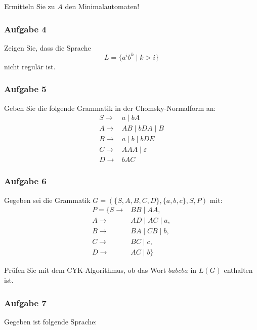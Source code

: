\documentclass[a4paper,14pt,ngerman]{scrartcl}
\begin{document}
Ermitteln Sie zu \(A\) den Minimalautomaten!
\subsubsection{\textbf{Aufgabe 4}}
\label{sec:org0993205}

Zeigen Sie, dass die Sprache \[L=\{a^ib^k \mid k > i\}\] nicht regulär
ist.
\subsubsection{\textbf{Aufgabe 5}}
\label{sec:orgcf073a4}

Geben Sie die folgende Grammatik in der Chomsky-Normalform an: \\

\[\begin{aligned}
        S \rightarrow & a \mid bA\\
        A \rightarrow & AB \mid bDA \mid B\\
        B \rightarrow & a \mid b \mid bDE\\
        C \rightarrow & AAA \mid \varepsilon\\  
        D \rightarrow & bAC 
\end{aligned}\]
\subsubsection{\textbf{Aufgabe 6}}
\label{sec:org95b2308}

Gegeben sei die Grammatik \(G=(\{S, A, B, C, D\}, \{a, b, c\}, S, P)\)
mit: \\

\[\begin{aligned}
        P=\{S\rightarrow & BB \mid AA,\\
        A\rightarrow & AD \mid AC \mid a,\\
        B\rightarrow & BA \mid CB \mid b,\\
        C\rightarrow & BC \mid c,\\
        D\rightarrow & AC \mid b\}  
\end{aligned}\]

Prüfen Sie mit dem CYK-Algorithmus, ob das Wort \(babcba\) in \(L(G)\) enthalten ist.
\subsubsection{\textbf{Aufgabe 7}}
\label{sec:orge63cb4a}

Gegeben ist folgende Sprache:
\end{document}
